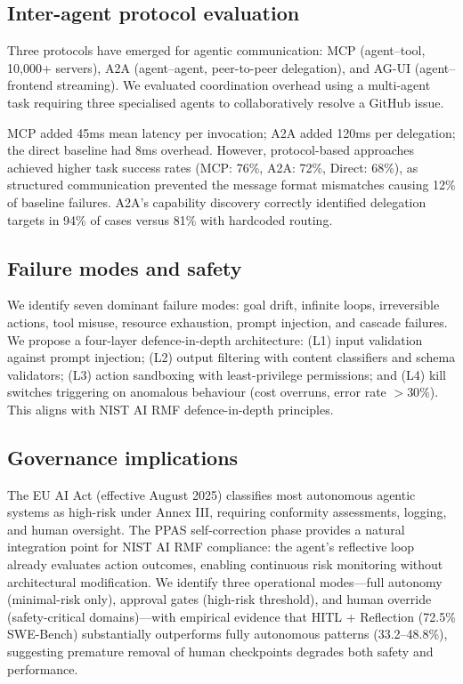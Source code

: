 \documentclass[10pt]{article}
\begin{document}
\subsection*{Inter-agent protocol evaluation}

Three protocols have emerged for agentic communication: MCP\cite{anthropic2024mcp} (agent--tool, 10,000+ servers), A2A\cite{google2024a2a} (agent--agent, peer-to-peer delegation), and AG-UI\cite{copilotkit2024agui} (agent--frontend streaming). We evaluated coordination overhead using a multi-agent task requiring three specialised agents to collaboratively resolve a GitHub issue.

MCP added 45ms mean latency per invocation; A2A added 120ms per delegation; the direct baseline had 8ms overhead. However, protocol-based approaches achieved higher task success rates (MCP: 76\%, A2A: 72\%, Direct: 68\%), as structured communication prevented the message format mismatches causing 12\% of baseline failures. A2A's capability discovery correctly identified delegation targets in 94\% of cases versus 81\% with hardcoded routing.

\subsection*{Failure modes and safety}

We identify seven dominant failure modes: goal drift, infinite loops, irreversible actions, tool misuse, resource exhaustion, prompt injection, and cascade failures. We propose a four-layer defence-in-depth architecture: (L1) input validation against prompt injection; (L2) output filtering with content classifiers and schema validators; (L3) action sandboxing with least-privilege permissions; and (L4) kill switches triggering on anomalous behaviour (cost overruns, error rate $>30\%$). This aligns with NIST AI RMF\cite{nist2023ai} defence-in-depth principles.

\subsection*{Governance implications}

The EU AI Act (effective August 2025) classifies most autonomous agentic systems as high-risk under Annex III, requiring conformity assessments, logging, and human oversight. The PPAS self-correction phase provides a natural integration point for NIST AI RMF compliance: the agent's reflective loop already evaluates action outcomes, enabling continuous risk monitoring without architectural modification. We identify three operational modes---full autonomy (minimal-risk only), approval gates (high-risk threshold), and human override (safety-critical domains)---with empirical evidence that HITL + Reflection (72.5\% SWE-Bench) substantially outperforms fully autonomous patterns (33.2--48.8\%), suggesting premature removal of human checkpoints degrades both safety and performance.
\end{document}
